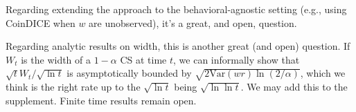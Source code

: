 \documentclass{article}
\begin{document}
Regarding extending the approach to the behavioral-agnostic setting (e.g., using CoinDICE when $w$ are unobserved),
it's a great, and open, question.

Regarding analytic results on width, this is another great 
(and open) question. 
If $W_t$ is the width of a $1-\alpha$ CS at time $t$, 
we can informally show that
$\sqrt{t}W_t/\sqrt{\ln t}$ is asymptotically bounded by $\sqrt{2\textrm{Var}(wr)\ln(2/\alpha)}$, which we think is the right rate up to the $\sqrt{\ln t}$ being $\sqrt{\ln \ln t}$. We may 
add this to the supplement. Finite time results
remain open.
\end{document}
